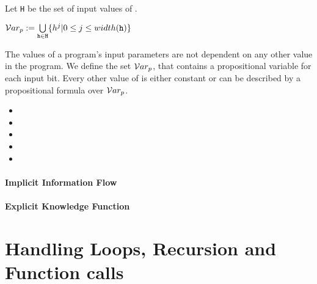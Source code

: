 \begin{definition}
    Let \texttt{H} be the set of input values of \pp.
    \begin{center}
        $\mathcal{V}ar_p := \bigcup\limits_{\mathtt{h} \in \mathtt{H}} \{h^j | 0 \leq j \leq width(\mathtt{h})\}$
    \end{center}
    The values of a program's input parameters are not dependent on any other value in the program. We define the set $\mathcal{V}ar_p$, that contains a propositional variable for each input bit. Every other value of \p is either constant or can be described by a propositional formula over $\mathcal{V}ar_p$.
\end{definition}

\textbf{}

\begin{itemize}
    \item {}
    \item {}
    \item {} 
    \item {}
    \item {}
\end{itemize}

\paragraph{Implicit Information Flow}


\paragraph{Explicit Knowledge Function}


\section{Handling Loops, Recursion and Function calls}

